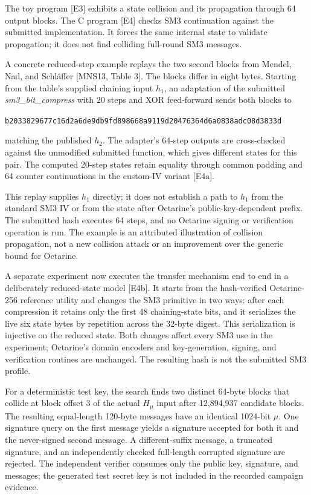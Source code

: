 \documentclass[
  american,
  10pt,
  a4paper,
]{article}
\begin{document}
The toy program {[}E3{]} exhibits a state collision and its propagation
through 64 output blocks. The C program {[}E4{]} checks SM3 continuation
against the submitted implementation. It forces the same internal state
to validate propagation; it does not find colliding full-round SM3
messages.

A concrete reduced-step example replays the two second blocks from
Mendel, Nad, and Schläffer {[}MNS13, Table 3{]}. The blocks differ in
eight bytes. Starting from the table's supplied chaining input \(h_1\),
an adaptation of the submitted \emph{sm3\_bit\_compress} with 20 steps
and XOR feed-forward sends both blocks to

\texttt{b2033829677c16d2a6de9db9fd898668a9119d20476364d6a0838adc08d3833d}

matching the published \(h_2\). The adapter's 64-step outputs are
cross-checked against the unmodified submitted function, which gives
different states for this pair. The computed 20-step states retain
equality through common padding and 64 counter continuations in the
custom-IV variant {[}E4a{]}.

This replay supplies \(h_1\) directly; it does not establish a path to
\(h_1\) from the standard SM3 IV or from the state after Octarine's
public-key-dependent prefix. The submitted hash executes 64 steps, and
no Octarine signing or verification operation is run. The example is an
attributed illustration of collision propagation, not a new collision
attack or an improvement over the generic bound for Octarine.

A separate experiment now executes the transfer mechanism end to end in
a deliberately reduced-state model {[}E4b{]}. It starts from the
hash-verified Octarine-256 reference utility and changes the SM3
primitive in two ways: after each compression it retains only the first
48 chaining-state bits, and it serializes the live six state bytes by
repetition across the 32-byte digest. This serialization is injective on
the reduced state. Both changes affect every SM3 use in the experiment;
Octarine's domain encoders and key-generation, signing, and verification
routines are unchanged. The resulting hash is not the submitted SM3
profile.

For a deterministic test key, the search finds two distinct 64-byte
blocks that collide at block offset 3 of the actual \(H_\mu\) input
after 12,894,937 candidate blocks. The resulting equal-length 120-byte
messages have an identical 1024-bit \(\mu\). One signature query on the
first message yields a signature accepted for both it and the
never-signed second message. A different-suffix message, a truncated
signature, and an independently checked full-length corrupted signature
are rejected. The independent verifier consumes only the public key,
signature, and messages; the generated test secret key is not included
in the recorded campaign evidence.
\end{document}
